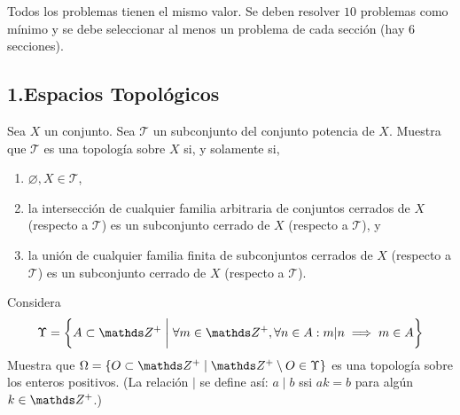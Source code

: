 \documentclass[b5paper,10pt,twoside]{book}
\begin{document}
\def\thetitle{Examen final}
\def\fechaentrega{31 de enero de 2025}


Todos los problemas tienen el mismo valor. Se deben resolver \(10\) problemas como mínimo y se debe seleccionar al menos un problema de cada sección (hay 6 secciones).



\subsection*{1.\enspace Espacios Topológicos}

\begin{problem}
Sea \(X\) un conjunto.
Sea \(\mathcal{T}\) un subconjunto del conjunto potencia de \(X\).
Muestra que \(\mathcal{T}\) es una topología sobre \(X\) si, y solamente si,
\begin{enumerate}[label=(\roman*)]
\item \(\varnothing, X\in \mathcal{T}\),
\item la intersección de cualquier familia arbitraria de conjuntos cerrados de \(X\) (respecto a \(\mathcal{T}\)) es un subconjunto cerrado de \(X\) (respecto a \(\mathcal{T}\)), y 
\item la unión de cualquier familia finita de subconjuntos cerrados de \(X\) (respecto a \(\mathcal{T}\)) es un subconjunto cerrado de \(X\) (respecto a \(\mathcal{T}\)).
\end{enumerate}
\end{problem}


\begin{problem}
Considera 
\[
\Upsilon  = \left\{ 
    A\subset \Z^+ \;\bigg|\; \forall m \in \Z^+, \forall n \in A :  m|n \implies m \in A
 \right\}
\]
Muestra que \( \Omega = \left\{ O \subset \Z^+ \mid \Z^+\setminus O \in \Upsilon \right\}  \) es una topología sobre los enteros positivos.
(La relación \(\mid\) se define así:  \(a\mid b\) ssi \(ak = b\) para algún   \(k\in \Z^+\).)
\end{problem}
\end{document}
